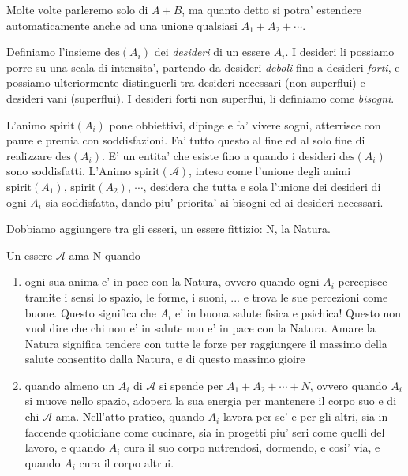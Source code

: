Molte volte parleremo solo di $A+B$, ma quanto detto si potra' estendere automaticamente anche ad una unione qualsiasi $A_1+A_2+\cdots$. \\

\def\des{\textrm{des}}

Definiamo l'insieme $\des(A_i)$ dei \emph{desideri} di un essere $A_i$. I desideri li possiamo porre su una scala di intensita', partendo da desideri \emph{deboli} fino a desideri \emph{forti}, e possiamo ulteriormente distinguerli tra desideri necessari (non superflui) e desideri vani (superflui). I desideri forti non superflui, li definiamo come \emph{bisogni}.

\def\anima#1{\mathcal{#1}}

\def\spirit#1{\textrm{spirit}(#1)}
\def\Animo#1{\spirit{\anima{#1}}}

L'animo $\spirit{A_i}$ pone obbiettivi, dipinge e fa' vivere sogni, atterrisce con paure e premia con soddisfazioni. Fa' tutto questo al fine ed al solo fine di realizzare $\des(A_i)$. E' un entita' che esiste fino a quando i desideri $\des(A_i)$ sono soddisfatti. L'Animo $\Animo{A}$, inteso come l'unione degli animi $\spirit{A_1}$, $\spirit{A_2}$, $\cdots$,  desidera che tutta e sola l'unione dei desideri di ogni $A_i$ sia soddisfatta, dando piu' priorita' ai bisogni ed ai desideri necessari.

Dobbiamo aggiungere tra gli esseri, un essere fittizio: N, la Natura.

Un essere $\anima{A}$ ama N quando 
\begin{enumerate}
    \item ogni sua anima e' in pace con la Natura, ovvero quando ogni $A_i$ percepisce tramite i sensi lo spazio, le forme, i suoni, ... e trova le sue percezioni come buone. Questo significa che $A_i$ e' in buona salute fisica e psichica! Questo non vuol dire che chi non e' in salute non e' in pace con la Natura. Amare la Natura significa tendere con tutte le forze per raggiungere il massimo della salute consentito dalla Natura, e di questo massimo gioire
    \item quando almeno un $A_i$ di $\anima{A}$ si spende per $A_1+A_2+\cdots+N$, ovvero quando $A_i$ si muove nello spazio, adopera la sua energia per mantenere il corpo suo e di chi $\anima{A}$ ama. Nell'atto pratico, quando $A_i$ lavora per se' e per gli altri, sia in faccende quotidiane come cucinare, sia in progetti piu' seri come quelli del lavoro, e quando $A_i$ cura il suo corpo nutrendosi, dormendo, e cosi' via, e quando $A_i$ cura il corpo altrui.
\end{enumerate}


